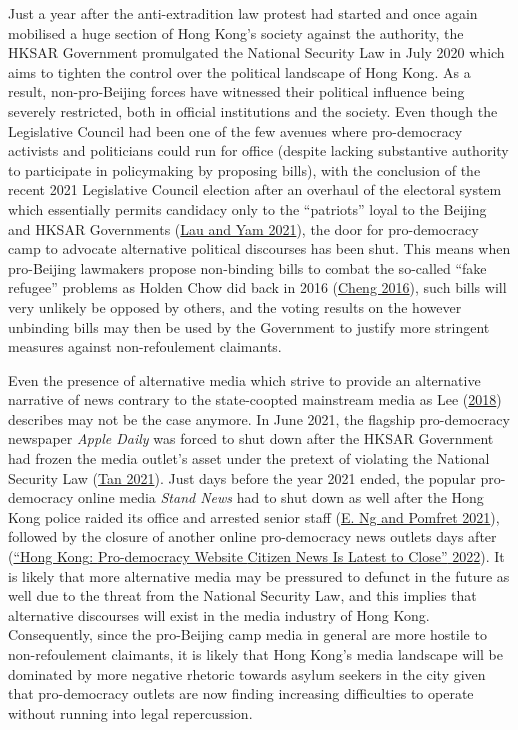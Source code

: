 \documentclass[a4paper, oneside]{report}
\begin{document}
Just a year after the anti-extradition law protest had started and once
again mobilised a huge section of Hong Kong's society against the
authority, the HKSAR Government promulgated the National Security Law in
July 2020 which aims to tighten the control over the political landscape
of Hong Kong. As a result, non-pro-Beijing forces have witnessed their
political influence being severely restricted, both in official
institutions and the society. Even though the Legislative Council had
been one of the few avenues where pro-democracy activists and
politicians could run for office (despite lacking substantive authority
to participate in policymaking by proposing bills), with the conclusion
of the recent 2021 Legislative Council election after an overhaul of the
electoral system which essentially permits candidacy only to the
``patriots'' loyal to the Beijing and HKSAR Governments
(\protect\hyperlink{ref-lauPatriotsOnlyHong2021}{Lau and Yam 2021}), the
door for pro-democracy camp to advocate alternative political discourses
has been shut. This means when pro-Beijing lawmakers propose non-binding
bills to combat the so-called ``fake refugee'' problems as Holden Chow
did back in 2016
(\protect\hyperlink{ref-chengLegislatureRejectsLawmaker2016}{Cheng
2016}), such bills will very unlikely be opposed by others, and the
voting results on the however unbinding bills may then be used by the
Government to justify more stringent measures against non-refoulement
claimants.

Even the presence of alternative media which strive to provide an
alternative narrative of news contrary to the state-coopted mainstream
media as Lee
(\protect\hyperlink{ref-leeChangingPoliticalEconomy2018}{2018})
describes may not be the case anymore. In June 2021, the flagship
pro-democracy newspaper \emph{Apple Daily} was forced to shut down after
the HKSAR Government had frozen the media outlet's asset under the
pretext of violating the National Security Law
(\protect\hyperlink{ref-tanAppleDailyHong2021}{Tan 2021}). Just days
before the year 2021 ended, the popular pro-democracy online media
\emph{Stand News} had to shut down as well after the Hong Kong police
raided its office and arrested senior staff
(\protect\hyperlink{ref-ngHongKongProdemocracy2021}{E. Ng and Pomfret
2021}), followed by the closure of another online pro-democracy news
outlets days after
(\protect\hyperlink{ref-HongKongProdemocracy2022}{{``Hong {Kong}:
{Pro-democracy} Website {Citizen News} Is Latest to Close''} 2022}). It
is likely that more alternative media may be pressured to defunct in the
future as well due to the threat from the National Security Law, and
this implies that alternative discourses will exist in the media
industry of Hong Kong. Consequently, since the pro-Beijing camp media in
general are more hostile to non-refoulement claimants, it is likely that
Hong Kong's media landscape will be dominated by more negative rhetoric
towards asylum seekers in the city given that pro-democracy outlets are
now finding increasing difficulties to operate without running into
legal repercussion.
\end{document}
